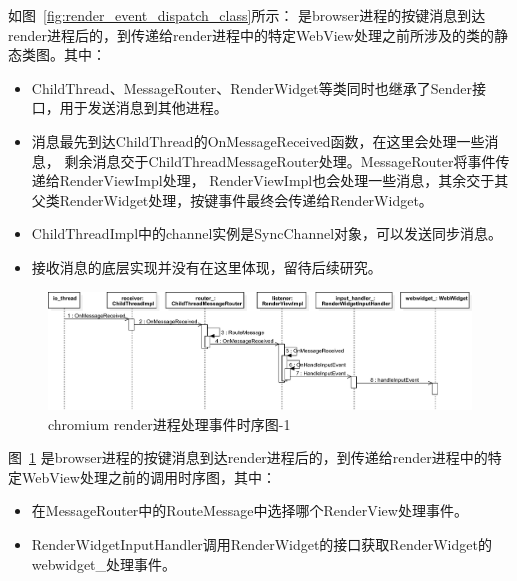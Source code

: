 \documentclass[12pt]{article}
\begin{document}
如图~\ref{fig:render_event_dispatch_class}所示：
是browser进程的按键消息到达render进程后的，到传递给render进程中的特定WebView处理之前所涉及的类的静态类图。其中：
\begin{itemize}
  \item ChildThread、MessageRouter、RenderWidget等类同时也继承了Sender接口，用于发送消息到其他进程。
  \item 消息最先到达ChildThread的OnMessageReceived函数，在这里会处理一些消息，
  剩余消息交于ChildThreadMessageRouter处理。MessageRouter将事件传递给RenderViewImpl处理，
  RenderViewImpl也会处理一些消息，其余交于其父类RenderWidget处理，按键事件最终会传递给RenderWidget。
  \item ChildThreadImpl中的channel实例是SyncChannel对象，可以发送同步消息。
  \item 接收消息的底层实现并没有在这里体现，留待后续研究。
\end{itemize}

\newpage
\begin{figure}[H] 
  \centering 
  \includegraphics[width=\textwidth]{image/render_event_dispatch_sequence.pdf} 
  \caption{chromium render进程处理事件时序图-1} \label{fig:render_event_dispatch_sequence} 
\end{figure}

图~\ref{fig:render_event_dispatch_sequence}
是browser进程的按键消息到达render进程后的，到传递给render进程中的特定WebView处理之前的调用时序图，其中：

\begin{itemize}
  \item 在MessageRouter中的RouteMessage中选择哪个RenderView处理事件。
  \item RenderWidgetInputHandler调用RenderWidget的接口获取RenderWidget的webwidget\_处理事件。
\end{itemize}
\end{document}
